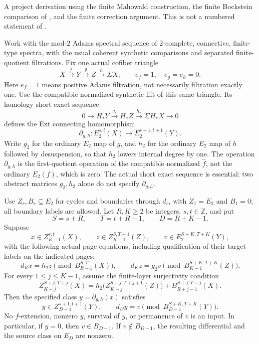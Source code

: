 \begin{theorem}
\label{sem:ProofTools:cprime}
A project derivation using the finite Mahowald construction, the finite
Bockstein comparison of \cite[Theorem A.1 and Corollary A.11]{BHS},
and the finite correction argument. This is not a numbered statement
of \cite{LWX126}.\par
Work with the mod-$2$ Adams spectral sequence of $2$-complete, connective,
finite-type spectra, with the usual coherent synthetic comparisons and
separated finite-quotient filtrations. Fix one actual cofiber triangle
\[
X\xrightarrow fY\xrightarrow gZ\xrightarrow h\Sigma X,
\qquad e_f=1,\quad e_g=e_h=0.
\]
Here $e_f=1$ means positive Adams filtration, not necessarily filtration
exactly one. Use the compatible normalized synthetic lift of this same
triangle. Its homology short exact sequence
\[
0\longrightarrow H_*Y\xrightarrow{g_*}H_*Z
 \xrightarrow{h_*}\Sigma H_*X\longrightarrow0
\]
defines the Ext connecting homomorphism
\[
\partial_{g,h}:E_2^{s,t}(X)\longrightarrow E_2^{s+1,t+1}(Y).
\]
Write $g_2$ for the ordinary $E_2$ map of $g$, and $h_2$ for the ordinary
$E_2$ map of $h$ followed by desuspension, so that $h_2$ lowers internal
degree by one. The operation $\partial_{g,h}$ is the first-quotient
operation of the compatible normalized $\widehat f$, not the ordinary
$E_2(f)$, which is zero. The actual short exact sequence is essential:
two abstract matrices $g_2,h_2$ alone do not specify $\partial_{g,h}$.

Use $Z_r,B_r\subseteq E_2$ for cycles and boundaries through $d_r$,
with $Z_1=E_2$ and $B_1=0$; all boundary labels are allowed.
Let $R,K\geq2$ be integers, $s,t\in\mathbb Z$, and put
\[
S=s+R,\qquad T=t+R-1,\qquad D=R+K-1.
\]
Suppose
\[
x\in Z_{R-1}^{s,t}(X),\qquad
z\in Z_{K-1}^{S,T+1}(Z),\qquad
v\in E_2^{S+K,T+K}(Y),
\]
with the following actual page equations, including qualification of
their target labels on the indicated pages:
\[
d_Rx=h_2z\pmod{B_{R-1}^{S,T}(X)},\qquad
d_Kz=g_2v\pmod{B_{K-1}^{S+K,T+K}(Z)}.
\]
For every $1\leq j\leq K-1$, assume the finite-layer surjectivity condition
\[
Z_{K-j}^{S+j,T+j}(X)
=h_2\bigl(Z_{K-j}^{S+j,T+j+1}(Z)\bigr)
 +B_{R+j-1}^{S+j,T+j}(X).
\tag{Surj}
\]
Then the specified class $y=\partial_{g,h}(x)$ satisfies
\[
y\in Z_{D-1}^{s+1,t+1}(Y),\qquad
d_Dy=v\pmod{B_{D-1}^{S+K,T+K}(Y)}.
\]
No $f$-extension, nonzero $y$, survival of $y$, or permanence of $v$
is an input. In particular, if $y=0$, then $v\in B_{D-1}$.
If $v\notin B_{D-1}$, the resulting differential and the source class
on $E_D$ are nonzero.


\end{theorem}
